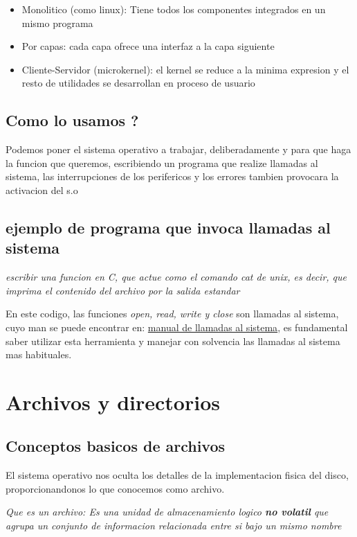 \documentclass[12pt, letterpaper]{article}
\begin{document}
\begin{itemize}
	\item{Monolitico (como linux): Tiene todos los componentes integrados en un mismo programa}
	\item{Por capas: cada capa ofrece una interfaz a la capa siguiente}
	\item{Cliente-Servidor (microkernel): el kernel se reduce a la minima expresion y el resto de utilidades se desarrollan en proceso de usuario}
\end{itemize}

\subsection{Como lo usamos ?}

Podemos poner el sistema operativo a trabajar, deliberadamente y para que haga la funcion que queremos, escribiendo un programa que realize llamadas al sistema, las interrupciones de los perifericos y los errores tambien provocara la activacion del s.o

\subsection{ejemplo de programa que invoca llamadas al sistema}
\textit{escribir una funcion en C, que actue como el comando cat de unix, es decir, que imprima el contenido del archivo por la salida estandar}



En este codigo, las funciones \textit{open, read, write y close} son llamadas al sistema, cuyo man se puede encontrar en: \href{http://man7.org/linux/man-pages/man2/}{manual de llamadas al sistema}, es fundamental saber utilizar esta herramienta y manejar con solvencia las llamadas al sistema mas habituales.

\section{Archivos y directorios}

\subsection{Conceptos basicos de archivos}
El sistema operativo nos oculta los detalles de la implementacion fisica del disco, proporcionandonos lo que conocemos como archivo.\par

\textit{Que es un archivo: Es una unidad de almacenamiento logico \textbf{no volatil} que agrupa un conjunto de informacion relacionada entre si bajo un mismo nombre}\par
\end{document}
